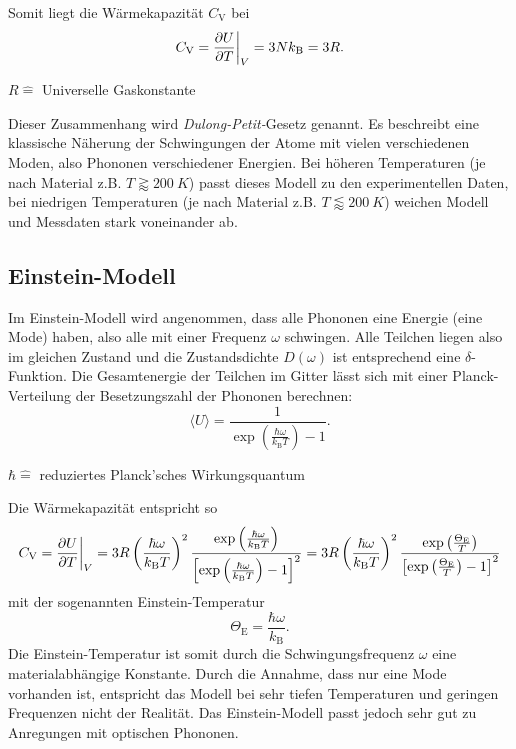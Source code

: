 Somit liegt die Wärmekapazität $C_{\text{V}}$ bei
\begin{equation*}
	C_{\text{V}} = \frac{\partial U}{\partial T} \bigg{\vert}_{V} = 3 N k_{\text{B}} = 3 R.
\end{equation*}
\begin{center}
	\tiny{$R \widehat{=}$ Universelle Gaskonstante}
\end{center}
Dieser Zusammenhang wird \textit{Dulong-Petit-}Gesetz genannt.
Es beschreibt eine klassische Näherung der Schwingungen der Atome mit vielen verschiedenen Moden, also Phononen verschiedener Energien.
Bei höheren Temperaturen (je nach Material z.B. $T \gtrapprox \SI{200}{K}$) passt dieses Modell zu den experimentellen Daten, bei niedrigen Temperaturen (je nach Material z.B. $T \lessapprox \SI{200}{K}$) weichen Modell und Messdaten stark voneinander ab.

\FloatBarrier
\subsection{Einstein-Modell}
Im Einstein-Modell wird angenommen, dass alle Phononen eine Energie (eine Mode) haben, also alle mit einer Frequenz $\omega$ schwingen.
Alle Teilchen liegen also im gleichen Zustand und die Zustandsdichte $D(\omega)$ ist entsprechend eine $\delta$-Funktion.
Die Gesamtenergie der Teilchen im Gitter lässt sich mit einer Planck-Verteilung der Besetzungszahl der Phononen berechnen:
\begin{equation*}
	\langle U \rangle = \frac{1}{\exp{\left( \frac{ \hbar \omega }{ k_{\text{B}} T } \right)} - 1}.
\end{equation*}
\begin{center}
	\tiny{$\hbar \widehat{=}$ reduziertes Planck'sches Wirkungsquantum}
\end{center}

Die Wärmekapazität entspricht so
\begin{equation*}
	C_{\text{V}} = \frac{\partial U}{\partial T} \bigg{\vert}_{V} = 3 R \left( \frac{\hbar \omega}{k_{\text{B}} T} \right)^2
	\frac{ \exp{\left( \frac{ \hbar \omega }{ k_{\text{B}} T } \right)} }{ \left[ \exp{\left( \frac{ \hbar \omega }{ k_{\text{B}} T } \right)} - 1 \right]^2 } =
	3 R \left( \frac{\hbar \omega}{k_{\text{B}} T} \right)^2
	\frac{ \exp{\left( \frac{ \Theta_{\text{E}} }{ T } \right)} }{ \left[ \exp{\left( \frac{ \Theta_{\text{E}} }{ T } \right)} - 1 \right]^2 }
\end{equation*}
mit der sogenannten Einstein-Temperatur
\begin{equation*}
	\Theta_{\text{E}} = \frac{\hbar \omega}{k_{\text{B}}}.
\end{equation*}
Die Einstein-Temperatur ist somit durch die Schwingungsfrequenz $\omega$ eine materialabhängige Konstante.
Durch die Annahme, dass nur eine Mode vorhanden ist, entspricht das Modell bei sehr tiefen Temperaturen und geringen Frequenzen nicht der Realität.
Das Einstein-Modell passt jedoch sehr gut zu Anregungen mit optischen Phononen.


